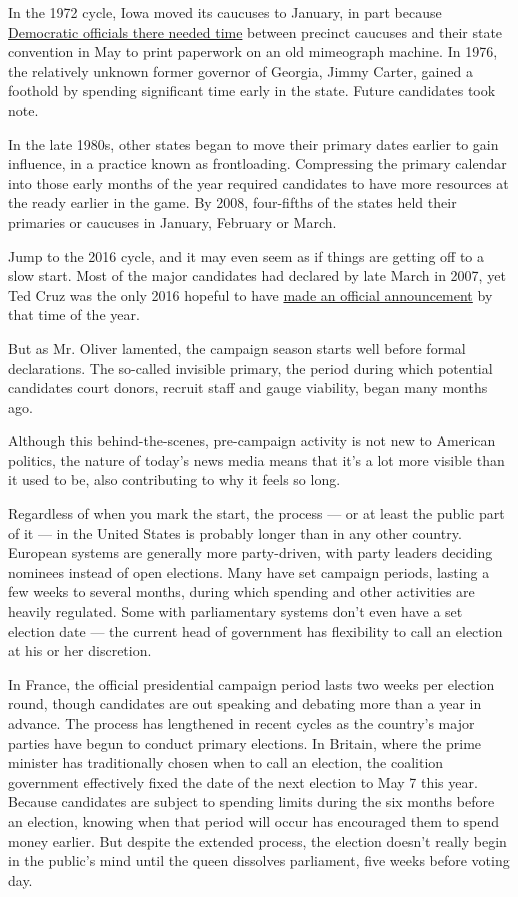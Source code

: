 In the 1972 cycle, Iowa moved its caucuses to January, in part because
\href{http://www.nytimes3xbfgragh.onion/1988/01/25/us/the-election-process-iowa-s-weighty-caucuses-significance-by-accident.html}{Democratic
officials there needed time} between precinct caucuses and their state
convention in May to print paperwork on an old mimeograph machine. In
1976, the relatively unknown former governor of Georgia, Jimmy Carter,
gained a foothold by spending significant time early in the state.
Future candidates took note.

In the late 1980s, other states began to move their primary dates
earlier to gain influence, in a practice known as frontloading.
Compressing the primary calendar into those early months of the year
required candidates to have more resources at the ready earlier in the
game. By 2008, four-fifths of the states held their primaries or
caucuses in January, February or March.

Jump to the 2016 cycle, and it may even seem as if things are getting
off to a slow start. Most of the major candidates had declared by late
March in 2007, yet Ted Cruz was the only 2016 hopeful to have
\href{http://www.nytimes3xbfgragh.onion/2015/03/23/us/politics/ted-cruz-to-announce-on-monday-he-plans-to-run-for-president.html}{made
an official announcement} by that time of the year.

But as Mr. Oliver lamented, the campaign season starts well before
formal declarations. The so-called invisible primary, the period during
which potential candidates court donors, recruit staff and gauge
viability, began many months ago.

Although this behind-the-scenes, pre-campaign activity is not new to
American politics, the nature of today's news media means that it's a
lot more visible than it used to be, also contributing to why it feels
so long.

Regardless of when you mark the start, the process --- or at least the
public part of it --- in the United States is probably longer than in
any other country. European systems are generally more party-driven,
with party leaders deciding nominees instead of open elections. Many
have set campaign periods, lasting a few weeks to several months, during
which spending and other activities are heavily regulated. Some with
parliamentary systems don't even have a set election date --- the
current head of government has flexibility to call an election at his or
her discretion.

In France, the official presidential campaign period lasts two weeks per
election round, though candidates are out speaking and debating more
than a year in advance. The process has lengthened in recent cycles as
the country's major parties have begun to conduct primary elections. In
Britain, where the prime minister has traditionally chosen when to call
an election, the coalition government effectively fixed the date of the
next election to May 7 this year. Because candidates are subject to
spending limits during the six months before an election, knowing when
that period will occur has encouraged them to spend money earlier. But
despite the extended process, the election doesn't really begin in the
public's mind until the queen dissolves parliament, five weeks before
voting day.

